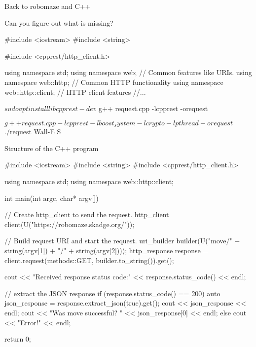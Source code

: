 \documentclass[compress]{beamer}
\begin{document}
\begin{frame}[fragile]{Back to robomaze and C++}

Can you figure out what is missing?

\pause

\begin{cppcode}
#include <iostream>
#include <string>

#include <cpprest/http_client.h>

using namespace std;
using namespace web;                        // Common features like URIs.
using namespace web::http;                  // Common HTTP functionality
using namespace web::http::client;          // HTTP client features
//...
\end{cppcode}

\pause

\begin{shcode}
$ sudo apt install libcpprest-dev
$ g++ request.cpp -lcpprest -orequest
\end{shcode}

\pause

\begin{shcode}
$ g++ request.cpp -lcpprest -lboost_system -lcrypto -lpthread -orequest
$ ./request Wall-E S
\end{shcode}


\end{frame}

\begin{frame}[fragile]{Structure of the C++ program}


\begin{cppcode}
#include <iostream>
#include <string>
#include <cpprest/http_client.h>

using namespace std;
using namespace web::http::client;

int main(int argc, char* argv[])
{
    // Create http_client to send the request.
    http_client client(U("https://robomaze.skadge.org/"));

    // Build request URI and start the request.
    uri_builder builder(U("move/" + string(argv[1]) + "/" + string(argv[2])));
    http_response response = client.request(methods::GET, builder.to_string()).get();

    cout << "Received response status code:" << response.status_code() << endl;

    // extract the JSON response
    if (response.status_code() == 200) {
        auto json_response = response.extract_json(true).get();
        cout << json_response << endl;
        cout << "Was move successful? " << json_response[0] << endl;
    }
    else {
        cout << "Error!" << endl;
    }

    return 0;
}
\end{cppcode}

\end{frame}
\end{document}
